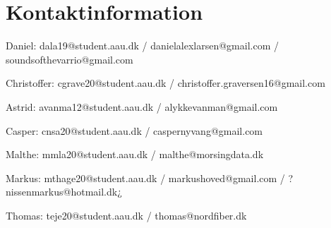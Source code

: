 \section{Kontaktinformation}
Daniel:
dala19@student.aau.dk / danielalexlarsen@gmail.com / soundsofthevarrio@gmail.com

Christoffer:
cgrave20@student.aau.dk / christoffer.graversen16@gmail.com

Astrid:
avanma12@student.aau.dk / alykkevanman@gmail.com

Casper:
cnsa20@student.aau.dk / caspernyvang@gmail.com

Malthe: 
mmla20@student.aau.dk / malthe@morsingdata.dk

Markus:
mthage20@student.aau.dk / markushoved@gmail.com / ?nissenmarkus@hotmail.dk¿

Thomas: 
teje20@student.aau.dk / thomas@nordfiber.dk


